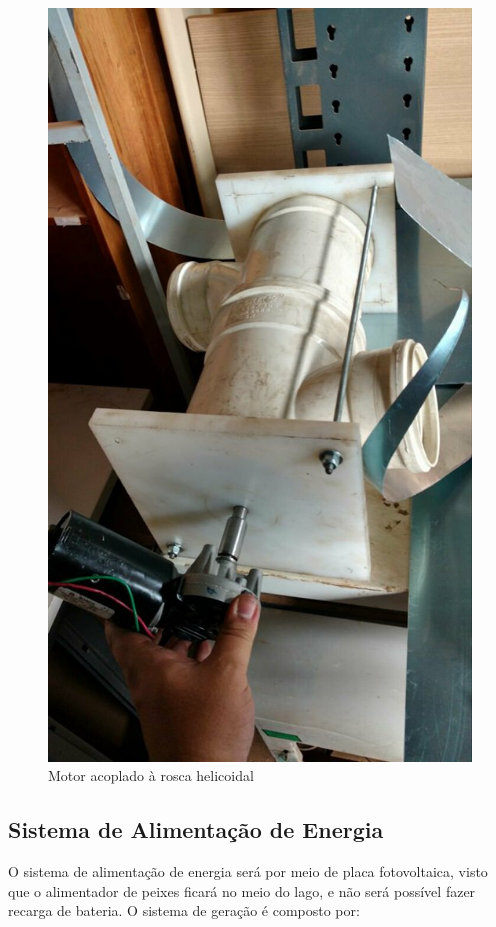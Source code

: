\begin{figure}[!h]
\centering \includegraphics[scale=0.3]{figuras/motor}
\caption{Motor acoplado à rosca helicoidal}
\label{motor}
 \end{figure}

\subsection{Sistema de Alimentação de Energia}
O sistema de alimentação de energia será por meio de placa fotovoltaica, visto que o alimentador de peixes ficará no meio do lago, e não será possível fazer recarga de bateria. O sistema de geração é composto por:

